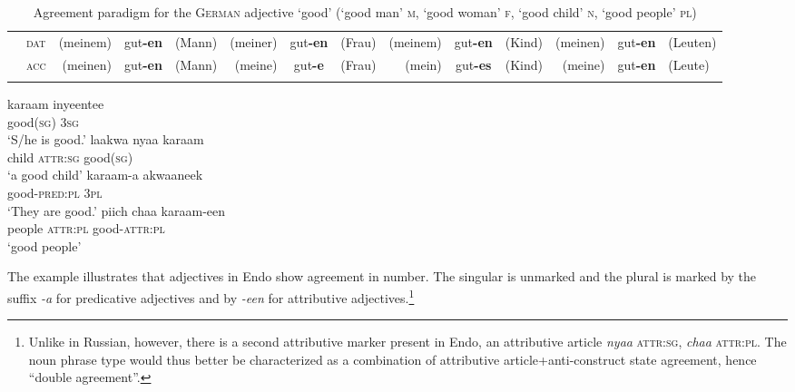 \begin{sidewaystable}
{\begin{tabular}{ll r@{\,}c@{\,}l r@{\,}c@{\,}l r@{\,}c@{\,}l r@{\,}c@{\,}l}
&\textsc{dat}&(meinem)&gut\textbf{-en}&(Mann)&(meiner)&gut\textbf{-en}&(Frau)&(meinem)&gut\textbf{-en}&(Kind)&(meinen)&gut\textbf{-en}&(Leuten)\\		
&\textsc{acc}&(meinen)&gut\textbf{-en}&(Mann)&(meine)&gut\textbf{-e}&(Frau)&(mein)&gut\textbf{-es}&(Kind)&(meine)&gut\textbf{-en}&(Leute)\\	
\lspbottomrule
\end{tabular}
}
\caption[Adjective paradigm for \textsc{German}]{Agreement paradigm for the \textsc{German} adjective ‘good’  (‘good man’ \textsc{m}, ‘good woman’ \textsc{f}, ‘good child’ \textsc{n}, ‘good people’ \textsc{pl})}
\label{german agr}
\end{sidewaystable}

\begin{exe}
\ex
{}
\begin{xlist}
\ex
\gll 	karaam 	inyeentee\\
	good(\textsc{sg}) \textsc{3sg}\\	
\glt	‘S/he is good.’
\ex	
\gll 	laakwa 	nyaa 		karaam\\
	child 	\textsc{attr:sg} 	good(\textsc{sg})\\	
\glt	‘a good child’
\ex	
\gll 	karaam-a 	akwaaneek\\
	good-\textsc{pred:pl} 	\textsc{3pl}\\
\glt	‘They are good.’
\ex	
\gll 	piich 	chaa 		karaam-een\\
	people 	\textsc{attr:pl} 	good-\textsc{attr:pl}\\
\glt	‘good people’
\end{xlist}
\end{exe}
The example illustrates that adjectives in Endo show agreement in number. The singular is unmarked and the plural is marked by the suffix \textit{-a} for predicative adjectives and by \textit{-een} for attributive adjectives.\footnote{Unlike in Russian, however, there is a second attributive marker present in Endo, an attributive article \textit{nyaa} \textsc{attr:sg}, \textit{chaa} \textsc{attr:pl}. The noun phrase type would thus better be characterized as a combination of attributive article+anti\hyp{}construct state agreement, hence “double agreement”.}

